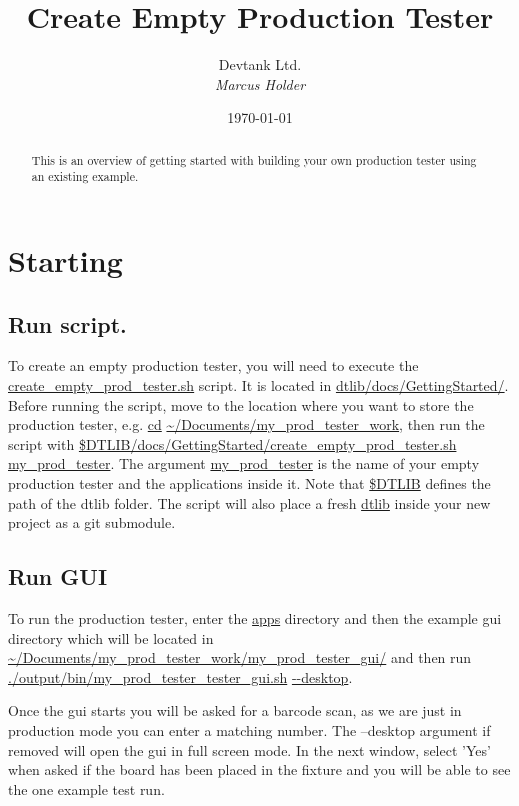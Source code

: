 \documentclass[a4paper,12pt, notitlepage]{article}
\begin{document}
\title{\textbf{\large{Create Empty Production Tester}}}

\author{\normalsize{Devtank Ltd.} \\
        \small\textit{
        Marcus Holder}}
\date{\today}

\maketitle 
\thispagestyle{fancy}


\begin{abstract} 
\noindent
This is an overview of getting started with building your own production tester using an existing example.
\end{abstract}
\vspace{11mm}

\newpage
\tableofcontents
\newpage


\section{Starting}
\label{sec: start}

\subsection{Run script.}
\label{renameStart}

To create an empty production tester, you will need to execute the \url{create_empty_prod_tester.sh} script. It is located in \url{dtlib/docs/GettingStarted/}. Before running the script, move to the location where you want to store the production tester, e.g. \url{cd} \url{~/Documents/my_prod_tester_work}, then run the script with \url{$DTLIB/docs/GettingStarted/create_empty_prod_tester.sh} \url{my_prod_tester}. The argument \url{my_prod_tester} is the name of your empty production tester and the applications inside it. Note that \url{$DTLIB} defines the path of the dtlib folder. The script will also place a fresh \url{dtlib} inside your new project as a git submodule.

\subsection{Run GUI}

To run the production tester, enter the \url{apps} directory and then the example gui directory which will be located in \url{~/Documents/my_prod_tester_work/my_prod_tester_gui/} and then run \url{./output/bin/my_prod_tester_tester_gui.sh} \url{--desktop}.

Once the gui starts you will be asked for a barcode scan, as we are just in production mode you can enter a matching number. The --desktop argument if removed will open the gui in full screen mode. In the next window, select 'Yes' when asked if the board has been placed in the fixture and you will be able to see the one example test run.
\end{document}
